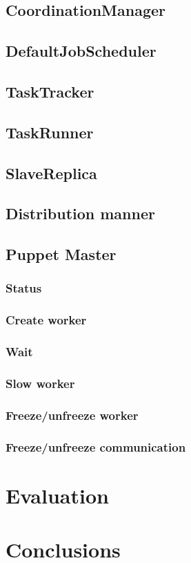 \documentclass[times, 10pt,twocolumn]{article}
\begin{document}
    	\subsection{CoordinationManager}
    	
    	\subsection{DefaultJobScheduler}
    	
    	\subsection{TaskTracker}
    	
    	\subsection{TaskRunner}
    	
    	\subsection{SlaveReplica}
    	
    	\subsection{Distribution manner}
    	
    	\subsection{Puppet Master}
    
    	\subsubsection{Status}
    		
    	\subsubsection{Create worker}
    	
    	\subsubsection{Wait}
    	
    	\subsubsection{Slow worker}
    	
    	\subsubsection{Freeze/unfreeze worker}
    	
    	\subsubsection{Freeze/unfreeze communication}
	
	\section{Evaluation}
	
	\section{Conclusions}
	
	
	
\end{document}
